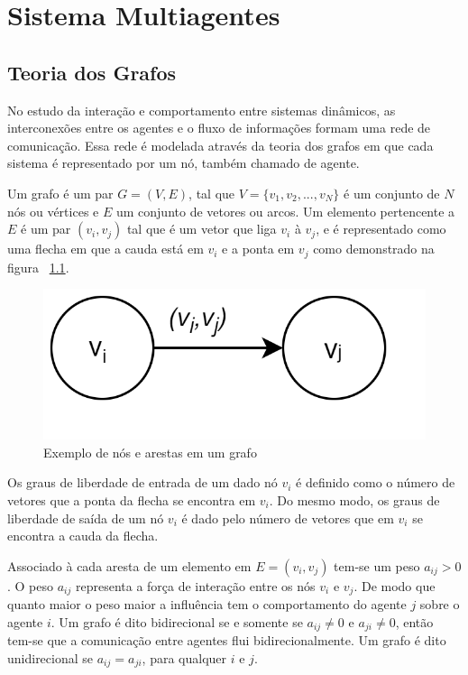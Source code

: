 \chapter{Sistema Multiagentes}

\section{Teoria dos Grafos}
No estudo da interação e comportamento entre sistemas dinâmicos, as interconexões entre os agentes e o fluxo de informações formam uma rede de comunicação. Essa rede é modelada através da teoria dos grafos em que cada sistema é representado por um nó, também chamado de agente.

Um grafo é um par $G = (V, E)$, tal que $V = \{v_{1},v_{2}, ...,v_{N}\}$ é um conjunto de $N$ nós ou vértices e $E$ um conjunto de vetores ou arcos. Um elemento pertencente a $E$ é um par $(v_{i}, v_{j})$ tal que é um vetor que liga $v_{i}$ à $v_{j}$, e é representado como uma flecha em que a cauda está em $v_{i}$ e a ponta em $v_{j}$ como demonstrado na figura ~\ref{fig:nos_arestas_grafos}. 

\begin{figure}[hb]
    \centering
    \includegraphics[scale=0.3]{figures/Multiagente/ex_grafo2.png}
    \caption{Exemplo de nós e arestas em um grafo}
    \label{fig:nos_arestas_grafos}
\end{figure}

Os graus de liberdade de entrada de um dado nó $v_i$ é definido como o número de vetores que a ponta da flecha se encontra em $v_i$. Do mesmo modo, os graus de liberdade de saída de um nó $v_i$ é dado pelo número de vetores que em $v_i$ se encontra a cauda da flecha.

Associado à cada aresta de um elemento em $E = (v_i, v_j)$ tem-se um peso $a_{ij} > 0$. O peso $a_{ij}$ representa a força de interação entre os nós $v_i$ e $v_j$. De modo que quanto maior o peso maior a influência tem o comportamento do agente $j$ sobre o agente $i$.
Um grafo é dito bidirecional se e somente se $a_{ij} \neq 0$ e $a_{ji} \neq 0$, então tem-se que a comunicação entre agentes flui bidirecionalmente. Um grafo é dito unidirecional se $a_{ij} = a_{ji}$, para qualquer $i$ e $j$.


